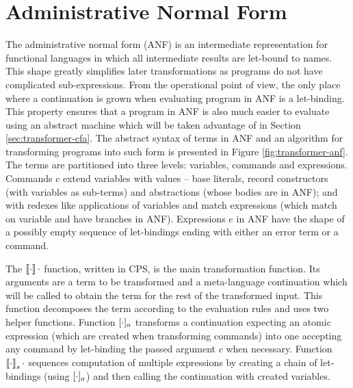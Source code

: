 \section{Administrative Normal Form}
The administrative normal form (ANF) \cite{flanagan-anf} is an intermediate representation for functional languages in which all intermediate results are let-bound to names.
This shape greatly simplifies later transformations as programs do not have complicated sub-expressions.
From the operational point of view, the only place where a continuation is grown when evaluating program in ANF is a let-binding.
This property ensures that a program in ANF is also much easier to evaluate using an abstract machine which will be taken advantage of in Section \ref{sec:transformer-cfa}.
The abstract syntax of terms in ANF and an algorithm for transforming \IDL{} programs into such form is presented in Figure \ref{fig:transformer-anf}.
The terms are partitioned into three levels: variables, commands and expressions.
Commands $c$ extend variables with values -- base literals, record constructors (with variables as sub-terms) and abstractions (whose bodies are in ANF); and with redexes like applications of variables and match expressions (which match on variable and have branches in ANF).
Expressions $e$ in ANF have the shape of a possibly empty sequence of let-bindings ending with either an error term or a command.

The $\left\llbracket \cdot \right\rrbracket\cdot$ function, written in CPS, is the main transformation function.
Its arguments are a term to be transformed and a meta-language continuation  which will be called to obtain the term for the rest of the transformed input.
This function decomposes the term according to the evaluation rules and uses two helper functions.
Function $[ \cdot ]_{a}$ transforms a continuation expecting an atomic expression (which are created when transforming commands) into one accepting any command by let-binding the passed argument $c$ when necessary.
Function $\left\llbracket \cdot \right\rrbracket_{s} \cdot$ sequences computation of multiple expressions by creating a chain of let-bindings (using $[ \cdot ]_{a}$) and then calling the continuation with created variables.

